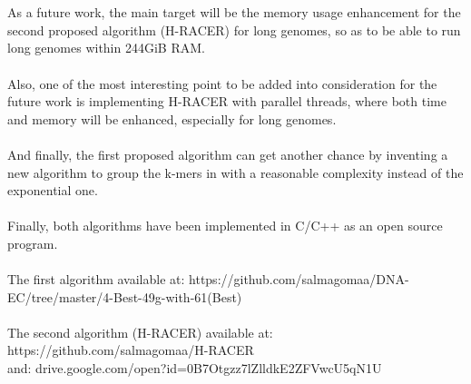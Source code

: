 \documentclass[12pt]{llncs}
\begin{document}
\\
\\
As a future work, the main target will be the memory usage enhancement for the second proposed algorithm (H-RACER) for long genomes, so as to be able to run long genomes within 244GiB RAM.
\\
\\
Also, one of the most interesting point to be added into consideration for the future work is implementing H-RACER with parallel threads, where both time and memory will be enhanced, especially for long genomes.
\\
\\
And finally, the first proposed algorithm can get another chance by inventing a new algorithm to group the k-mers in with a reasonable complexity instead of the exponential one.
\\
\\
Finally, both algorithms have been implemented in C/C++ as an open source program.
\\
\\
The first algorithm available at: https://github.com/salmagomaa/DNA-EC/tree/master/4-Best-49g-with-61(Best)
\\
\\
The second algorithm (H-RACER) available at: https://github.com/salmagomaa/H-RACER \\
and: drive.google.com/open?id=0B7Otgzz7lZlldkE2ZFVwcU5qN1U

\newpage
 
\end{document}
